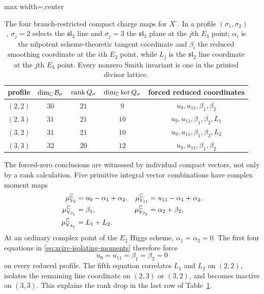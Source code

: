 \begin{table}[t]
\centering
\small
\begin{adjustbox}{max width=\textwidth,center}
\begin{tabular}{@{}ccccc@{}}
\toprule
profile & $\dim_{\mathbb C}\mathcal B_\sigma$ & $\operatorname{rank} Q_\sigma$ & $\dim_{\mathbb C}\ker Q_\sigma$ & forced reduced coordinates \\
\midrule
$(2,2)$ & $30$ & $21$ & $9$ & $u_9,u_{11},\beta_1,\beta_2$ \\
$(2,3)$ & $31$ & $21$ & $10$ & $u_9,u_{11},\beta_1,\beta_2,L_1$ \\
$(3,2)$ & $31$ & $21$ & $10$ & $u_9,u_{11},\beta_1,\beta_2,L_2$ \\
$(3,3)$ & $32$ & $20$ & $12$ & $u_9,u_{11},\beta_1,\beta_2$ \\
\bottomrule
\end{tabular}
\end{adjustbox}
\caption{The four branch-restricted compact charge maps for $X^{\circ}$.
In a profile $(\sigma_1,\sigma_2)$, $\sigma_j=2$ selects the
$\mathfrak{sl}_2$ line and $\sigma_j=3$ the $\mathfrak{sl}_3$ plane at the
$j$th $E_3$ point; $\alpha_i$ is the nilpotent scheme-theoretic tangent
coordinate and $\beta_i$ the reduced smoothing coordinate at the $i$th $E_2$
point, while $L_j$ is the $\mathfrak{sl}_2$ line coordinate
at the $j$th $E_3$ point. Every nonzero Smith invariant is one in the printed
divisor lattice.}
\label{tab:xcirc-profiles}
\end{table}

The forced-zero conclusions are witnessed by individual compact vectors, not
only by a rank calculation. Five primitive integral vector combinations have
complex moment maps
\begin{align}
 \mu_{V_9}^{\mathbb C}&=u_9-\alpha_1+\alpha_2,&
 \mu_{V_{11}}^{\mathbb C}&=u_{11}-\alpha_1+\alpha_2,
 \nonumber\\
 \mu_{V_{\beta_1}}^{\mathbb C}&=\beta_1,&
 \mu_{V_{\beta_2}}^{\mathbb C}&=\alpha_2+\beta_2,
 \nonumber\\
 \mu_{V_{A_1}}^{\mathbb C}&=L_1+L_2.
 \label{eq:xcirc-isolating-moments}
\end{align}
At an ordinary complex point of the $E_2$ Higgs scheme,
$\alpha_1=\alpha_2=0$. The first four equations in
\eqref{eq:xcirc-isolating-moments} therefore force
\begin{equation}
 u_9=u_{11}=\beta_1=\beta_2=0
 \label{eq:xcirc-universal-zeros}
\end{equation}
on every reduced profile. The fifth equation correlates $L_1$ and $L_2$ on
$(2,2)$, isolates the remaining line coordinate on $(2,3)$ or $(3,2)$, and
becomes inactive on $(3,3)$. This explains the rank drop in the last row of
Table~\ref{tab:xcirc-profiles}.

